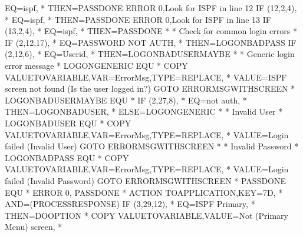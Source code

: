 \documentclass[letterpaper,10pt,english]{sphinxmanual}
\begin{document}
\begin{sphinxVerbatim}[commandchars=\\\{\}]
         EQ=\PYGZsq{}ispf\PYGZsq{},                                              *
         THEN=PASSDONE
   ERROR\PYGZdl{} 0,\PYGZsq{}Look for ISPF in line 12\PYGZsq{}
   IF\PYGZdl{} (12,2,4),                                                 *
         EQ=\PYGZsq{}ispf\PYGZsq{},                                              *
         THEN=PASSDONE
   ERROR\PYGZdl{} 0,\PYGZsq{}Look for ISPF in line 13\PYGZsq{}
   IF\PYGZdl{} (13,2,4),                                                 *
         EQ=\PYGZsq{}ispf\PYGZsq{},                                              *
         THEN=PASSDONE
*
* Check for common login errors
*
   IF\PYGZdl{} (2,12,17),                                                *
         EQ=\PYGZsq{}PASSWORD NOT AUTH\PYGZsq{},                                 *
         THEN=LOGON\PYGZus{}BADPASS
   IF\PYGZdl{} (2,12,6),                                                 *
         EQ=\PYGZsq{}Userid\PYGZsq{},                                            *
         THEN=LOGON\PYGZus{}BADUSER\PYGZus{}MAYBE
*
* Generic login error message
*
LOGON\PYGZus{}GENERIC EQU *
   COPY\PYGZdl{} VALUE\PYGZhy{}TO\PYGZhy{}VARIABLE,VAR=\PYGZsq{}ErrorMsg\PYGZsq{},TYPE=REPLACE,          *
         VALUE=\PYGZsq{}ISPF screen not found (Is the user logged in?)\PYGZsq{}
   GOTO\PYGZdl{} ERRORMSG\PYGZus{}WITH\PYGZus{}SCREEN
*
LOGON\PYGZus{}BADUSER\PYGZus{}MAYBE EQU *
   IF\PYGZdl{} (2,27,8),                                                 *
         EQ=\PYGZsq{}not auth\PYGZsq{},                                          *
         THEN=LOGON\PYGZus{}BADUSER,                                     *
         ELSE=LOGON\PYGZus{}GENERIC
*
* Invalid User
*
LOGON\PYGZus{}BADUSER EQU *
   COPY\PYGZdl{} VALUE\PYGZhy{}TO\PYGZhy{}VARIABLE,VAR=\PYGZsq{}ErrorMsg\PYGZsq{},TYPE=REPLACE,          *
         VALUE=\PYGZsq{}Login failed (Invalid User)\PYGZsq{}
   GOTO\PYGZdl{} ERRORMSG\PYGZus{}WITH\PYGZus{}SCREEN
*
* Invalid Password
*
LOGON\PYGZus{}BADPASS EQU *
   COPY\PYGZdl{} VALUE\PYGZhy{}TO\PYGZhy{}VARIABLE,VAR=\PYGZsq{}ErrorMsg\PYGZsq{},TYPE=REPLACE,          *
         VALUE=\PYGZsq{}Login failed (Invalid Password)\PYGZsq{}
   GOTO\PYGZdl{} ERRORMSG\PYGZus{}WITH\PYGZus{}SCREEN
*
PASSDONE EQU   *
   ERROR\PYGZdl{} 0,\PYGZsq{}\PYGZhy{}\PYGZhy{}\PYGZhy{} PASSDONE\PYGZsq{}
*
   ACTION\PYGZdl{}  TO\PYGZhy{}APPLICATION,KEY=7D,                               *
         AND=(PROCESS\PYGZhy{}RESPONSE)
   IF\PYGZdl{} (3,29,12),                                                *
         EQ=\PYGZsq{}ISPF Primary\PYGZsq{},                                      *
         THEN=DOOPTION
*
   COPY\PYGZdl{} VALUE\PYGZhy{}TO\PYGZhy{}VARIABLE,VALUE=\PYGZsq{}Not (Primary Menu) screen\PYGZsq{},    *

\end{sphinxVerbatim}
\end{document}
